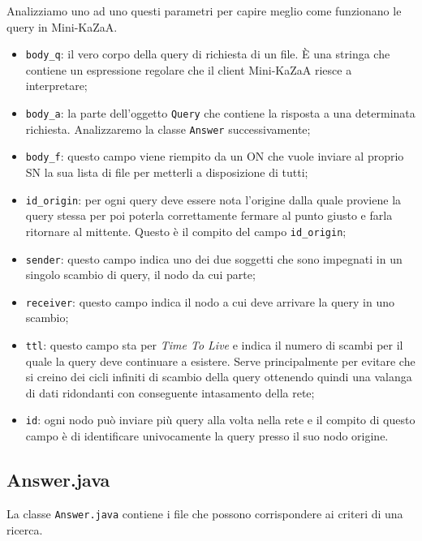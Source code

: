 Analizziamo uno ad uno questi parametri per capire meglio come funzionano le query in Mini-KaZaA.
\begin{itemize}
 \item \verb|body_q|:
il vero corpo della query di richiesta di un file. \`{E} una stringa che contiene un
espressione regolare che il client Mini-KaZaA riesce a interpretare;

 \item \verb|body_a|:
la parte dell'oggetto \verb|Query| che contiene la risposta a una determinata richiesta. Analizzaremo la classe
\verb|Answer| successivamente;

 \item \verb|body_f|:
questo campo viene riempito da un ON che vuole inviare al proprio SN la sua lista di file per metterli a disposizione
di tutti;

 \item \verb|id_origin|:
per ogni query deve essere nota l'origine dalla quale proviene la query stessa per poi poterla correttamente fermare
al punto giusto e farla ritornare al mittente. Questo è il compito del campo \verb|id_origin|;

 \item \verb|sender|: 
questo campo indica uno dei due soggetti che sono impegnati in un singolo scambio di query, il nodo da cui parte;

 \item \verb|receiver|:
questo campo indica il nodo a cui deve arrivare la query in uno scambio;

 \item \verb|ttl|:
questo campo sta per \emph{Time To Live} e indica il numero di scambi per il quale la query deve continuare a esistere.
Serve principalmente per evitare che si creino dei cicli infiniti di scambio della query ottenendo quindi una valanga
di dati ridondanti con conseguente intasamento della rete;

 \item \verb|id|:
ogni nodo può inviare più query alla volta nella rete e il compito di questo campo è di identificare univocamente la
query presso il suo nodo origine.
\end{itemize}

\subsection{Answer.java}
La classe \verb|Answer.java| contiene i file che possono corrispondere ai criteri di una ricerca. 


